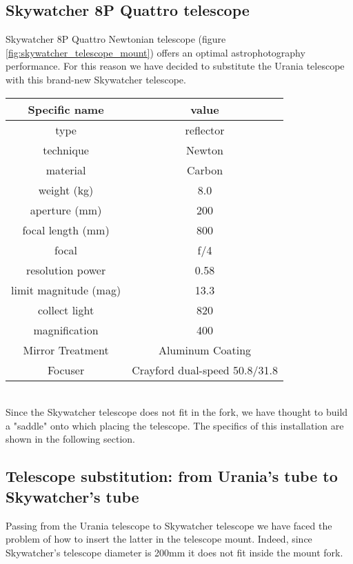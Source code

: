 \subsection{Skywatcher 8P Quattro telescope}
Skywatcher 8P Quattro Newtonian telescope (figure \ref{fig:skywatcher_telescope_mount}) offers an optimal astrophotography performance.
For this reason we have decided to substitute the Urania telescope with this brand-new Skywatcher telescope.
\\
\begin{minipage}{0.5\textwidth}
    \centering
    \begin{tabular}{c|c}
        Specific name & value \\
        \hline
        type & reflector \\
        technique & Newton  \\
        material & Carbon  \\
        weight (kg) & 8.0 \\
        aperture (mm) & 200 \\
        focal length (mm) & 800 \\
        focal & f/4 \\
        resolution power & 0.58 \\
        limit magnitude (mag) & 13.3 \\
        collect light & 820 \\
        magnification & 400 \\
        Mirror Treatment & Aluminum Coating \\
        Focuser & Crayford dual-speed 50.8/31.8 \\
        \hline
    \end{tabular}
    \label{tab_skywatcher_quattro}
\end{minipage}
\\
Since the Skywatcher telescope does not fit in the fork, we have thought to build a "saddle" onto which placing the telescope.
The specifics of this installation are shown in the following section.

\subsection{Telescope substitution: from Urania's tube to Skywatcher's tube}
Passing from the Urania telescope to Skywatcher telescope we have faced the problem of how to insert the latter in the telescope mount.
Indeed, since Skywatcher's telescope diameter is 200mm it does not fit inside the mount fork.

